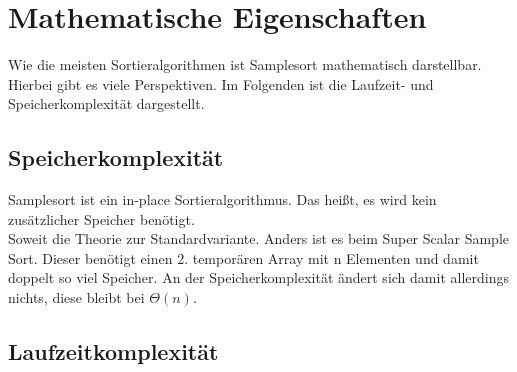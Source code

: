 \section{Mathematische Eigenschaften}
	Wie die meisten Sortieralgorithmen ist Samplesort mathematisch darstellbar.
	Hierbei gibt es viele Perspektiven.
	Im Folgenden ist die Laufzeit- und Speicherkomplexität dargestellt.
	
	\subsection{Speicherkomplexität}
		Samplesort ist ein in-place Sortieralgorithmus.
		Das heißt, es wird kein zusätzlicher Speicher benötigt.\\
		Soweit die Theorie zur Standardvariante.
		Anders ist es beim Super Scalar Sample Sort. \autocite{sanders-2004} 
		Dieser benötigt einen 2. temporären Array mit n Elementen und damit doppelt so viel Speicher.
		An der Speicherkomplexität ändert sich damit allerdings nichts, diese bleibt bei $\Theta(n)$.
	\subsection{Laufzeitkomplexität}

		
